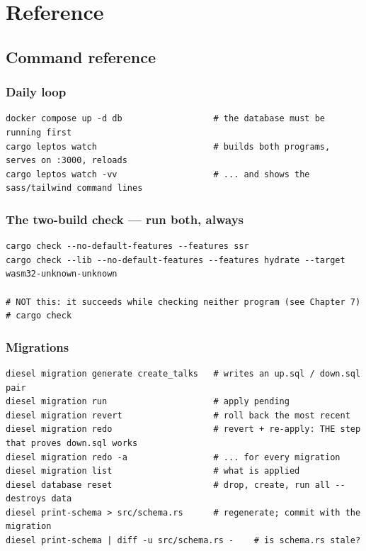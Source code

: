 \appendix
\part{Reference}

\chapter{Command reference}

\section{Daily loop}

\begin{lstlisting}[style=sh]
docker compose up -d db                  # the database must be running first
cargo leptos watch                       # builds both programs, serves on :3000, reloads
cargo leptos watch -vv                   # ... and shows the sass/tailwind command lines
\end{lstlisting}

\section{The two-build check --- run both, always}

\begin{lstlisting}[style=sh]
cargo check --no-default-features --features ssr
cargo check --lib --no-default-features --features hydrate --target wasm32-unknown-unknown

# NOT this: it succeeds while checking neither program (see Chapter 7)
# cargo check
\end{lstlisting}

\section{Migrations}

\begin{lstlisting}[style=sh]
diesel migration generate create_talks   # writes an up.sql / down.sql pair
diesel migration run                     # apply pending
diesel migration revert                  # roll back the most recent
diesel migration redo                    # revert + re-apply: THE step that proves down.sql works
diesel migration redo -a                 # ... for every migration
diesel migration list                    # what is applied
diesel database reset                    # drop, create, run all -- destroys data
diesel print-schema > src/schema.rs      # regenerate; commit with the migration
diesel print-schema | diff -u src/schema.rs -    # is schema.rs stale?
\end{lstlisting}

